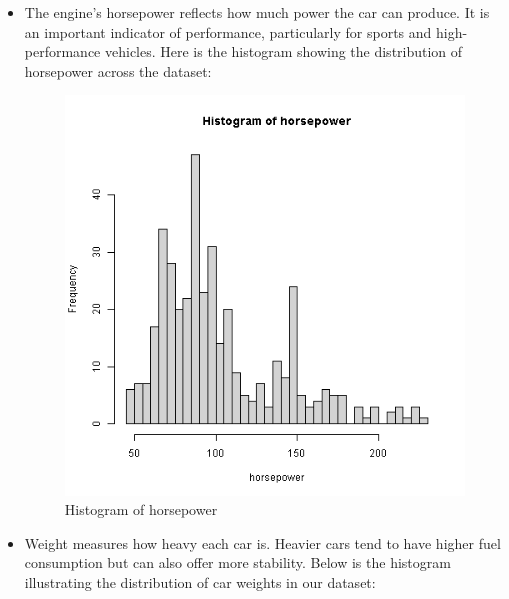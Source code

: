 \begin{itemize}
    \item The engine's horsepower reflects how much power the car can produce. It is an important indicator of performance, particularly for sports and high-performance vehicles. Here is the histogram showing the distribution of horsepower across the dataset:

\begin{figure}[H]
\centering
\includegraphics[scale=0.55]{img/hphist.png}
\caption{Histogram of horsepower}
\label{fig:horsepower_histogram}
\end{figure}

    \item Weight measures how heavy each car is. Heavier cars tend to have higher fuel consumption but can also offer more stability. Below is the histogram illustrating the distribution of car weights in our dataset:


\end{itemize}
